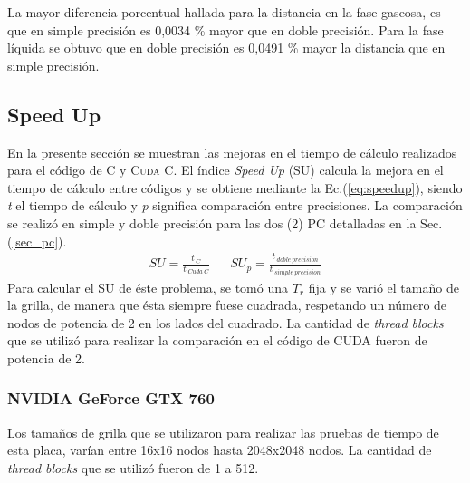 
La mayor diferencia porcentual hallada para la distancia en la fase gaseosa, es que en simple precisión es 0,0034 \% mayor que en doble precisión. Para la fase líquida se obtuvo que en doble precisión es 0,0491 \% mayor la distancia que en simple precisión.


%

\newpage

\subsection{Speed Up}

En la presente sección se muestran las mejoras en el tiempo de cálculo realizados para el código de \textsc{C} y \textsc{Cuda C}. El índice \textit{Speed Up} (SU) calcula la mejora en el tiempo de cálculo entre códigos y se obtiene mediante la Ec.(\ref{eq:speedup}), siendo \textit{t} el tiempo de cálculo y \textit{p} significa comparación entre precisiones. La comparación se realizó en simple y doble precisión para las dos (2) PC detalladas en la Sec. (\ref{sec_pc}).
\begin{align}
	SU = \frac{t_{\>C}}{t_{\>Cuda \> C}} & & 	{SU}_p = \frac{t_{\>doble \> precision}}{t_{\>simple \> precision}} 
	\label{eq:speedup}
\end{align}
Para calcular el \textsc{SU} de éste problema, se tomó una $T_r$ fija y se varió el tamaño de la grilla, de manera que ésta siempre fuese cuadrada, respetando un número de nodos de potencia de 2 en los lados del cuadrado. La cantidad de \textit{thread blocks} que se utilizó para realizar la comparación en el código de \textsc{CUDA} fueron de potencia de 2.

\subsubsection{NVIDIA GeForce GTX 760}

Los tamaños de grilla que se utilizaron para realizar las pruebas de tiempo de esta placa, varían entre 16x16 nodos hasta 2048x2048 nodos. La cantidad de \textit{thread blocks} que se utilizó fueron de 1 a 512.

